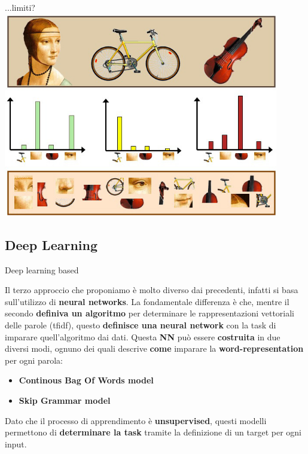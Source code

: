 \documentclass[british]{beamer}
\begin{document}
\begin{frame}{...limiti?}
	\includegraphics[width=0.9\textwidth, height=0.8\textheight]{./Imgs/bow-example.jpeg}
\end{frame}

\subsection{Deep Learning}

\begin{frame}{Deep learning based}
	
	Il terzo approccio che proponiamo \`{e} molto diverso dai precedenti, infatti si basa sull'utilizzo di \textbf{neural networks}.
	La fondamentale differenza \`{e} che, mentre il secondo \textbf{definiva un algoritmo} per determinare le rappresentazioni vettoriali delle parole (tfidf), questo \textbf{definisce una neural network} con la task di imparare quell'algoritmo dai dati.
	Questa \textbf{NN} pu\`{o} essere \textbf{costruita} in due diversi modi, ognuno dei quali descrive \textbf{come} imparare la \textbf{word-representation} per ogni parola:
	\begin{itemize}
		\item \textbf{Continous Bag Of Words model}
		\item \textbf{Skip Grammar model}
	\end{itemize}
	Dato che il processo di apprendimento \`{e} \textbf{unsupervised}, questi modelli permettono di \textbf{determinare la task} tramite la definizione di un target per ogni input.
\end{frame}
	
\end{document}
